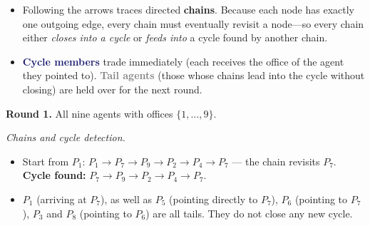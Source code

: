 {\begin{itemize}
    \item Following the arrows traces directed \textbf{chains}. Because each node has exactly one outgoing edge, every chain must eventually revisit a node---so every chain either \emph{closes into a cycle} or \emph{feeds into} a cycle found by another chain.
    \item \textcolor{MidnightBlue}{\textbf{Cycle members}} trade immediately (each receives the office of the agent they pointed to). \textcolor{gray}{\textbf{Tail agents}} (those whose chains lead into the cycle without closing) are held over for the next round.
\end{itemize}

\medskip
\noindent\textbf{Round 1.} All nine agents with offices $\{1,\ldots,9\}$.

\begin{center}
\end{center}

\noindent\emph{Chains and cycle detection.}
\begin{itemize}
    \item Start from $P_1$: $P_1\!\to\!P_7\!\to\!P_9\!\to\!P_2\!\to\!P_4\!\to\!P_7$ --- the chain revisits $P_7$. \textbf{Cycle found:} $P_7\!\to\!P_9\!\to\!P_2\!\to\!P_4\!\to\!P_7$.
    \item $P_1$ (arriving at $P_7$), as well as $P_5$ (pointing directly to $P_7$), $P_6$ (pointing to $P_7$), $P_3$ and $P_8$ (pointing to $P_6$) are all tails. They do not close any new cycle.
\end{itemize}

}
